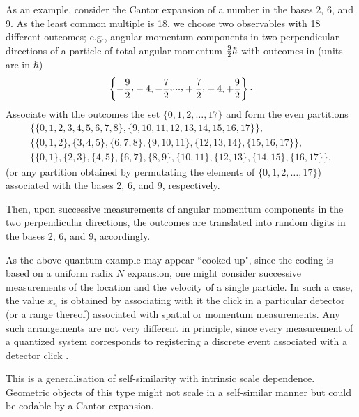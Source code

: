 \documentclass[12pt]{iopart}
\begin{document}
As an example, consider the Cantor expansion of a number in the bases
 2, 6, and 9. As the  least common multiple is 18, we choose two
observables with 18 different outcomes; e.g., angular momentum
components in two perpendicular directions of a particle of total
angular
momentum  ${9\over 2} \hbar$ with outcomes in  (units are in $\hbar$)
$$\left\{ -{9\over 2} \raisebox{.4ex}{,}-4,-{7\over 2}
\raisebox{.4ex}{,}
\raisebox{.4ex}{.}\raisebox{.4ex}{.}\raisebox{.4ex}{.,} +{7\over 2} \raisebox{.4ex}{,} +4,+{9\over
2}\right\} \raisebox{.4ex}{.}$$
Associate with the outcomes the set
$\{0,1,2,\ldots ,17\}$
and form the even partitions
\begin{eqnarray}
&\{\{0,1,2,3,4,5,6,7,8\},\{9,10,11,12,13,14,15,16,17\}\},&\nonumber  \\
&\{\{0,1,2\},\{3,4,5\},\{6,7,8\},\{9,10,11\},\{12,13,14\},\{15,16,17\}\},&\nonumber  \\
&\{\{0,1\},\{2,3\},\{4,5\},\{6,7\},\{8,9\},\{10,11\},\{12,13\},\{14,15\},\{1
6,17\}\},&\nonumber
\end{eqnarray}
(or any partition obtained by permutating the elements of $\{0,1,2,\ldots
,17\}$)
associated with the bases  2, 6, and 9, respectively.

Then, upon successive measurements of angular momentum
components in the two perpendicular directions,
the outcomes  are translated into random digits in the bases  2, 6, and 9,
accordingly.


As the above quantum example may appear   ``cooked up",  since  the
coding is based on a uniform radix $N$ expansion, one
might consider successive measurements of the location and the velocity of
a single particle. In such a case, the value $x_n$ is obtained by
associating with it
the click in a particular detector (or a range thereof) associated with
spatial or momentum measurements. Any such arrangements are not very
different in principle, since every measurement of a quantized system
corresponds to registering a discrete event associated with a detector
click \cite{sum-3}.




This is a generalisation of self-similarity with intrinsic scale dependence.
Geometric objects of this type might not scale in a self-similar manner
but could be codable by a Cantor expansion.
\end{document}
